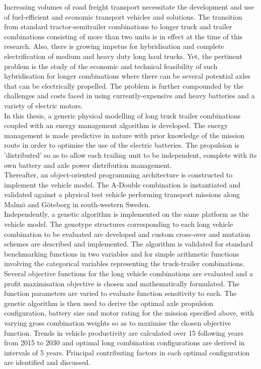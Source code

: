 Increasing volumes of road freight transport necessitate the development and use of fuel-efficient and economic transport vehicles and solutions. The transition from standard tractor-semitrailer combinations to longer truck and trailer combinations consisting of more than two units is in effect at the time of this research. Also, there is growing impetus for hybridisation and complete electrification of medium and heavy duty long haul trucks. Yet, the pertinent problem is the study of the economic and technical feasibility of such hybridisation for longer combinations where there can be several potential axles that can be electrically propelled. The problem is further compounded by the challenges and costs faced in using currently-expensive and heavy batteries and a variety of electric motors.\\

In this thesis, a generic physical modelling of long truck trailer combinations coupled with an energy management algorithm is developed. The energy management is made predictive in nature with prior knowledge of the mission route in order to optimise the use of the electric batteries. The propulsion is 'distributed' so as to allow each trailing unit to be independent, complete with its own battery and axle power distribution management.\\

Thereafter, an object-oriented programming architecture is constructed to implement the vehicle model. The A-Double combination is instantiated and validated against a physical test vehicle performing transport missions along Malm\"o and G\"oteborg in south-western Sweden.\\

Independently, a genetic algorithm is implemented on the same platform as the vehicle model. The genotype  structures corresponding to each long vehicle combination to be evaluated are developed and custom cross-over and mutation schemes are described and implemented. The algorithm is validated for standard benchmarking functions in two variables and for simple arithmetic functions involving the categorical variables representing the truck-trailer combinations.\\

Several objective functions for the long vehicle combinations are evaluated and a profit maximisation objective is chosen and mathematically formulated. The function parameters are varied to evaluate function sensitivity to each. The genetic algorithm is then used to derive the optimal axle propulsion configuration, battery size and motor rating for the mission specified above, with varying gross combination weights so as to maximise the chosen objective function. Trends in vehicle productivity are calculated over 15 following years from 2015 to 2030 and optimal long combination configurations are derived in intervals of 5 years. Principal contributing factors in each optimal configuration are identified and discussed.\\